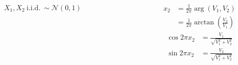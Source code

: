 \documentclass[10pt, serif, mathserif]{beamer}
\begin{document}
\begin{frame}
\begin{columns}[t]
\begin{column}{.6\textwidth}
\begin{enumerate}
          $ X_1,X_2\ \text{i.i.d.}\ \sim \mathcal{N}(0,1)$
      \end{enumerate}  
    \end{column}
    \begin{column}{.4\textwidth}
      \bigskip
      \bigskip
      \bigskip
      \bigskip
      \bigskip
      \begin{align*}
        x_2 &= \frac{1}{2\pi}\arg(V_1,V_2) \\&= \frac{1}{2\pi}\arctan\left(\frac{V_2}{V_1}\right) 
      \end{align*}
      \begin{align*}
        \cos 2\pi x_2 &= \frac{V_1}{\sqrt{V_1^2+V_2^2}} \\
        \sin 2\pi x_2 &= \frac{V_2}{\sqrt{V_1^2+V_2^2}}
      \end{align*}
    \end{column}
  \end{columns}
\end{frame}
\end{document}
